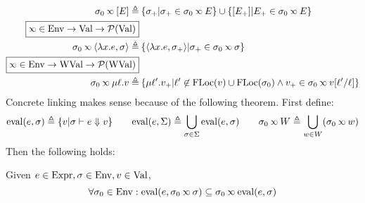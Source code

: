 \documentclass{article}
\begin{document}
\begin{align*}
	\ctx_0\semlink[E]\triangleq                            & \: \{\ctx_+|\ctx_+\in\ctx_0\semlink\event\}\cup\{[\event_+]|\event_+\in\ctx_0\semlink\event\}                                             \\
	\fbox{$\semlink\in\Ctx\rightarrow\Value\rightarrow\pset(\Value)$}                                                                                                                                  \\
	\ctx_0\semlink\langle\lambda x.e,\ctx\rangle\triangleq & \: \{\langle\lambda x.e,\ctx_+\rangle|\ctx_+\in\ctx_0\semlink\ctx\}                                                                       \\
	\fbox{$\semlink\in\Ctx\rightarrow\Walue\rightarrow\pset(\Walue)$}                                                                                                                                  \\
	\ctx_0\semlink\mu\ell.v\triangleq                      & \: \{\mu\ell'.v_+|\ell'\not\in\FLoc(v)\cup\FLoc(\ctx_0)\land v_+\in\ctx_0\semlink v[\ell'/\ell]\}
\end{align*}
Concrete linking makes sense because of the following theorem.
First define:
\[\eval(e,\ctx)\triangleq\{v|\ctx\vdash e\Downarrow v\}\qquad\eval(e,\Sigma)\triangleq\bigcup_{\ctx\in\Sigma}\eval(e,\ctx)\qquad\ctx_0\semlink W\triangleq\bigcup_{w\in W}(\ctx_0\semlink w)\]
Then the following holds:
\begin{thm}\label{thm:linksound}
	Given $e\in\text{Expr},\sigma\in\text{Env},v\in\text{Val}$,
	\[\forall\ctx_0\in\Ctx:\eval(e,\ctx_0\semlink\ctx)\subseteq\ctx_0\semlink\eval(e,\ctx)\]
\end{thm}
\end{document}
